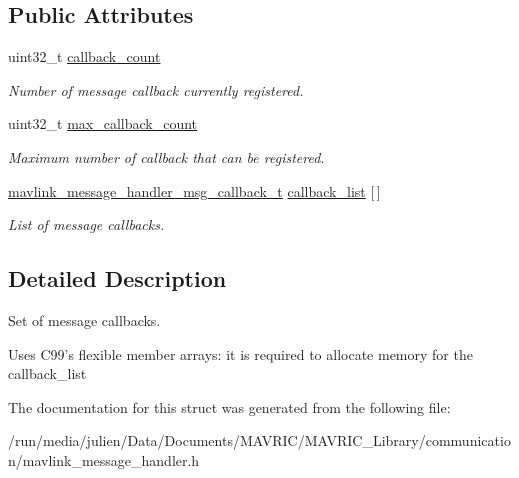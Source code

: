 \subsection*{Public Attributes}
\begin{DoxyCompactItemize}
\item 
\hypertarget{structmavlink__message__handler__msg__callback__set__t_a72af6888f28571bde596207bdfe23cee}{uint32\+\_\+t \hyperlink{structmavlink__message__handler__msg__callback__set__t_a72af6888f28571bde596207bdfe23cee}{callback\+\_\+count}}\label{structmavlink__message__handler__msg__callback__set__t_a72af6888f28571bde596207bdfe23cee}

\begin{DoxyCompactList}\small\item\em Number of message callback currently registered. \end{DoxyCompactList}\item 
\hypertarget{structmavlink__message__handler__msg__callback__set__t_ae0524500560d30911b2756d1510a53e0}{uint32\+\_\+t \hyperlink{structmavlink__message__handler__msg__callback__set__t_ae0524500560d30911b2756d1510a53e0}{max\+\_\+callback\+\_\+count}}\label{structmavlink__message__handler__msg__callback__set__t_ae0524500560d30911b2756d1510a53e0}

\begin{DoxyCompactList}\small\item\em Maximum number of callback that can be registered. \end{DoxyCompactList}\item 
\hypertarget{structmavlink__message__handler__msg__callback__set__t_a00953cbe52547a30284eec3d81021191}{\hyperlink{structmavlink__message__handler__msg__callback__t}{mavlink\+\_\+message\+\_\+handler\+\_\+msg\+\_\+callback\+\_\+t} \hyperlink{structmavlink__message__handler__msg__callback__set__t_a00953cbe52547a30284eec3d81021191}{callback\+\_\+list} \mbox{[}$\,$\mbox{]}}\label{structmavlink__message__handler__msg__callback__set__t_a00953cbe52547a30284eec3d81021191}

\begin{DoxyCompactList}\small\item\em List of message callbacks. \end{DoxyCompactList}\end{DoxyCompactItemize}


\subsection{Detailed Description}
Set of message callbacks. 

Uses C99's flexible member arrays\+: it is required to allocate memory for the callback\+\_\+list 

The documentation for this struct was generated from the following file\+:\begin{DoxyCompactItemize}
\item 
/run/media/julien/\+Data/\+Documents/\+M\+A\+V\+R\+I\+C/\+M\+A\+V\+R\+I\+C\+\_\+\+Library/communication/mavlink\+\_\+message\+\_\+handler.\+h\end{DoxyCompactItemize}
